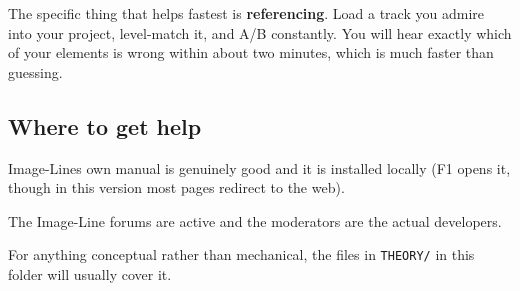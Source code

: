 The specific thing that helps fastest is \textbf{referencing}. Load a track you admire into your
project, level-match it, and A/B constantly. You will hear exactly which of your elements is
wrong within about two minutes, which is much faster than guessing.

\subsection{Where to get help}\label{fl06_trouble-where-to-get-help}

Image-Line\textquotesingle s own manual is genuinely good and it is installed locally (F1 opens it, though
in this version most pages redirect to the web).

The Image-Line forums are active and the moderators are the actual developers.

For anything conceptual rather than mechanical, the files in \texttt{THEORY/} in this folder will
usually cover it.
